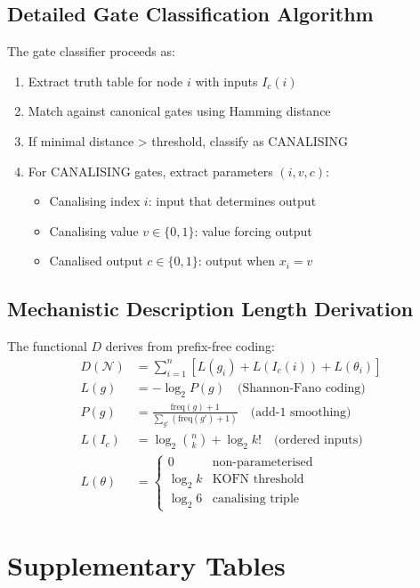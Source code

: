 \documentclass[12pt]{article}
\begin{document}
\subsection{Detailed Gate Classification Algorithm}
The gate classifier proceeds as:
\begin{enumerate}
    \item Extract truth table for node \(i\) with inputs \(I_c(i)\)
    \item Match against canonical gates using Hamming distance
    \item If minimal distance > threshold, classify as CANALISING
    \item For CANALISING gates, extract parameters \((i, v, c)\):
    \begin{itemize}
        \item Canalising index \(i\): input that determines output
        \item Canalising value \(v \in \{0,1\}\): value forcing output
        \item Canalised output \(c \in \{0,1\}\): output when \(x_i = v\)
    \end{itemize}
\end{enumerate}

\subsection{Mechanistic Description Length Derivation}
The functional \(D\) derives from prefix-free coding:
\begin{align*}
D(\mathcal{N}) &= \sum_{i=1}^n \left[ L(g_i) + L(I_c(i)) + L(\theta_i) \right] \\
L(g) &= -\log_2 P(g) \quad \text{(Shannon-Fano coding)} \\
P(g) &= \frac{\text{freq}(g) + 1}{\sum_{g'}(\text{freq}(g') + 1)} \quad \text{(add-1 smoothing)} \\
L(I_c) &= \log_2 \binom{n}{k} + \log_2 k! \quad \text{(ordered inputs)} \\
L(\theta) &= \begin{cases}
0 & \text{non-parameterised} \\
\log_2 k & \text{KOFN threshold} \\
\log_2 6 & \text{canalising triple}
\end{cases}
\end{align*}

\section{Supplementary Tables}
\end{document}
